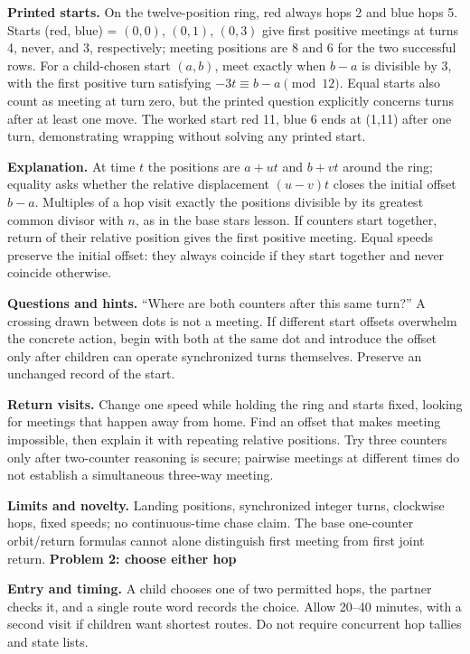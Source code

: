 \documentclass[11pt]{article}
\newcommand\lead[1]{\textbf{#1}\par}
\begin{document}
\textbf{Printed starts.} On the twelve-position ring, red always hops 2 and blue hops 5. Starts (red, blue) = $(0,0)$, $(0,1)$, $(0,3)$ give first positive meetings at turns 4, never, and 3, respectively; meeting positions are 8 and 6 for the two successful rows. For a child-chosen start $(a,b)$, meet exactly when $b-a$ is divisible by 3, with the first positive turn satisfying $-3t\equiv b-a\pmod{12}$. Equal starts also count as meeting at turn zero, but the printed question explicitly concerns turns after at least one move. The worked start red 11, blue 6 ends at (1,11) after one turn, demonstrating wrapping without solving any printed start.

\textbf{Explanation.} At time $t$ the positions are $a+ut$ and $b+vt$ around the ring; equality asks whether the relative displacement $(u-v)t$ closes the initial offset $b-a$. Multiples of a hop visit exactly the positions divisible by its greatest common divisor with $n$, as in the base stars lesson. If counters start together, return of their relative position gives the first positive meeting. Equal speeds preserve the initial offset: they always coincide if they start together and never coincide otherwise.

\textbf{Questions and hints.} ``Where are both counters after this same turn?'' A crossing drawn between dots is not a meeting. If different start offsets overwhelm the concrete action, begin with both at the same dot and introduce the offset only after children can operate synchronized turns themselves. Preserve an unchanged record of the start.

\textbf{Return visits.} Change one speed while holding the ring and starts fixed, looking for meetings that happen away from home. Find an offset that makes meeting impossible, then explain it with repeating relative positions. Try three counters only after two-counter reasoning is secure; pairwise meetings at different times do not establish a simultaneous three-way meeting.

\textbf{Limits and novelty.} Landing positions, synchronized integer turns, clockwise hops, fixed speeds; no continuous-time chase claim. The base one-counter orbit/return formulas cannot alone distinguish first meeting from first joint return.
\newpage
\lead{Problem 2: choose either hop}
\textbf{Entry and timing.} A child chooses one of two permitted hops, the partner checks it, and a single route word records the choice. Allow 20--40 minutes, with a second visit if children want shortest routes. Do not require concurrent hop tallies and state lists.
\end{document}
